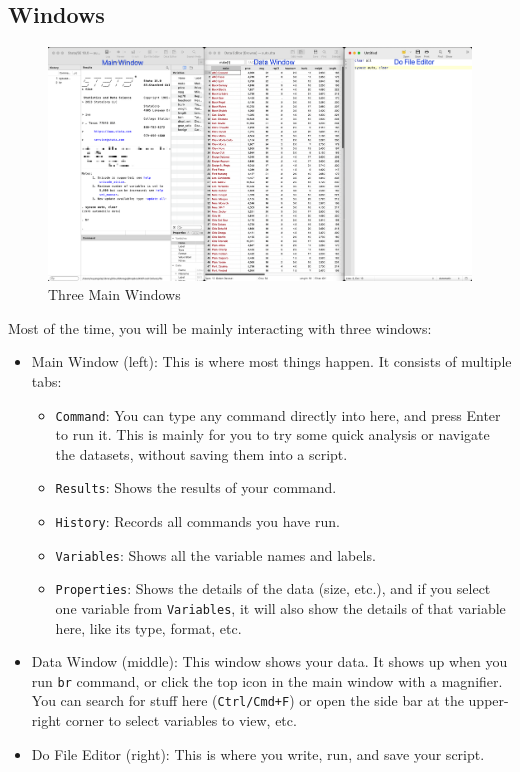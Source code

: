 \subsection{Windows}
\begin{figure}[H]
    \centering
    \caption{Three Main Windows}
    \includegraphics[width=\linewidth]{Output/Figures/windows.png}
\end{figure}
Most of the time, you will be mainly interacting with three windows:
\begin{itemize}
    \item Main Window (left): This is where most things happen. It consists of multiple tabs:
    \begin{itemize}
        \item \verb|Command|: You can type any command directly into here, and press Enter to run it. This is mainly for you to try some quick analysis or navigate the datasets, without saving them into a script.
        \item \verb|Results|: Shows the results of your command.
        \item \verb|History|: Records all commands you have run.
        \item \verb|Variables|: Shows all the variable names and labels.
        \item \verb|Properties|: Shows the details of the data (size, etc.), and if you select one variable from \verb|Variables|, it will also show the details of that variable here, like its type, format, etc.   
    \end{itemize}
    \item Data Window (middle): This window shows your data. It shows up when you run \verb|br| command, or click the top icon in the main window with a magnifier. You can search for stuff here (\verb|Ctrl/Cmd+F|) or open the side bar at the upper-right corner to select variables to view, etc. 
    \item Do File Editor (right): This is where you write, run, and save your script.  
\end{itemize}

